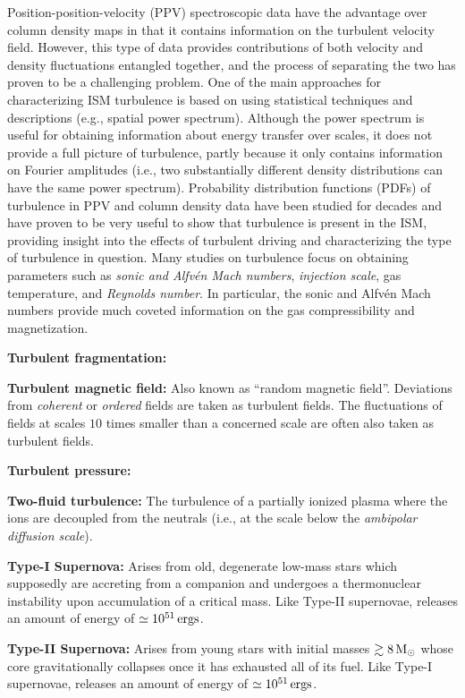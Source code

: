 \documentclass[a4paper,10pt]{article}
\begin{document}
Position-position-velocity (PPV) spectroscopic data have the advantage over column density maps in that it contains information on the turbulent velocity field. However, this type of data provides contributions of both velocity and density fluctuations entangled together, and the process of separating the two has proven to be a challenging problem. One of the main approaches for characterizing ISM turbulence is based on using statistical techniques and descriptions (e.g., spatial power spectrum). Although the power spectrum is useful for obtaining information about energy transfer over scales, it does not provide a full picture of turbulence, partly because it only contains information on Fourier amplitudes (i.e., two substantially different density distributions can have the same power spectrum). Probability distribution functions (PDFs) of turbulence in PPV and column density data have been studied for decades and have proven to be very useful to show that turbulence is present in the ISM, providing insight into the effects of turbulent driving and characterizing the type of turbulence in question. Many studies on turbulence focus on obtaining parameters such as \textit{sonic and Alfv\'en Mach numbers}, \textit{injection scale}, gas temperature, and \textit{Reynolds number}. In particular, the sonic and Alfv\'en Mach numbers provide much coveted information on the gas compressibility and magnetization.

{\noindent}\textbf{Turbulent fragmentation:}

{\noindent}\textbf{Turbulent magnetic field:} Also known as ``random magnetic field''. Deviations from \textit{coherent} or \textit{ordered} fields are taken as turbulent fields. The fluctuations of fields at scales $10$ times smaller than a concerned scale are often also taken as turbulent fields.

{\noindent}\textbf{Turbulent pressure:}

{\noindent}\textbf{Two-fluid turbulence:} The turbulence of a partially ionized plasma where the ions are decoupled from the neutrals (i.e., at the scale below the \textit{ambipolar diffusion scale}).

{\noindent}\textbf{Type-I Supernova:} Arises from old, degenerate low-mass stars which supposedly are accreting from a companion and undergoes a thermonuclear instability upon accumulation of a critical mass. Like Type-II supernovae, releases an amount of energy of $\simeq10^{51}\,{\rm ergs}$.

{\noindent}\textbf{Type-II Supernova:} Arises from young stars with initial masses $\gtrsim8\,{\rm M}_\odot$ whose core gravitationally collapses once it has exhausted all of its fuel. Like Type-I supernovae, releases an amount of energy of $\simeq10^{51}\,{\rm ergs}$.
\end{document}
